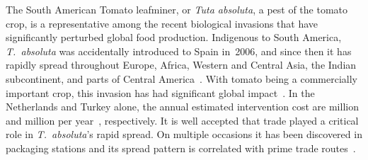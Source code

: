 \documentclass[11pt]{article}
\newcommand{\tuta}{\emph{T.~absoluta}}
\theoremstyle{definition}
\begin{document}
The South American Tomato leafminer, or \emph{Tuta absoluta}, a pest of the
tomato crop, is a representative among the recent biological invasions that
have significantly perturbed global food production. Indigenous to South
America, \tuta{} was accidentally introduced to Spain in~2006, and since
then it has rapidly spread throughout Europe, Africa, Western and Central
Asia, the Indian subcontinent, and parts of Central
America~\cite{desneux2010biological,biondi2017}. With tomato being a
commercially important crop, this invasion has had significant global
impact~\cite{campos2017western}. In the Netherlands and Turkey alone, the
annual estimated intervention cost are  million and 
million per year~\cite{}, respectively. It is well accepted that trade
played a critical role in \tuta{}'s rapid spread. On multiple occasions it
has been discovered in packaging stations and its spread pattern is
correlated with prime trade routes~\cite{karadjova2013tuta}. 




\end{document}
